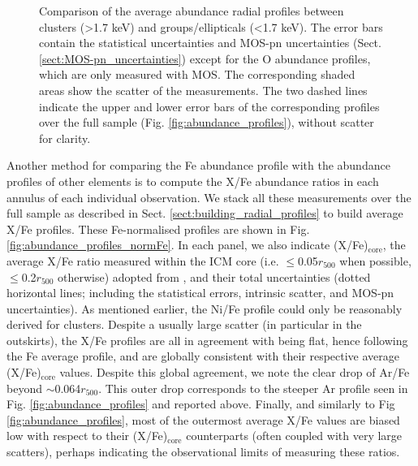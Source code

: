 \documentclass{aa}
\begin{document}
\begin{figure}[!]
        \caption{Comparison of the average abundance radial profiles between clusters (>1.7 keV) and groups/ellipticals (<1.7 keV). The error bars contain the statistical uncertainties and MOS-pn uncertainties (Sect. \ref{sect:MOS-pn_uncertainties}) except for the O abundance profiles, which are only measured with MOS. The corresponding shaded areas show the scatter of the measurements. The two dashed lines indicate the upper and lower error bars of the corresponding profiles over the full sample (Fig. \ref{fig:abundance_profiles}), without scatter for clarity.}
\label{fig:abundance_profiles_clgr}
\end{figure}



Another method for comparing the Fe abundance profile with the abundance profiles of other elements is to compute the X/Fe abundance ratios in each annulus of each individual observation. We stack all these measurements over the full sample as described in Sect. \ref{sect:building_radial_profiles} to build average X/Fe profiles. These Fe-normalised profiles are shown in Fig. \ref{fig:abundance_profiles_normFe}. In each panel, we also indicate (X/Fe)$_\text{core}$, the average X/Fe ratio measured within the ICM core (i.e. $\le$0.05$r_{500}$ when possible, $\le$0.2$r_{500}$ otherwise) adopted from \citet{2016A&A...592A.157M}, and their total uncertainties (dotted horizontal lines; including the statistical errors, intrinsic scatter, and MOS-pn uncertainties). As mentioned earlier, the Ni/Fe profile could only be reasonably derived for clusters. Despite a usually large scatter (in particular in the outskirts), the X/Fe profiles are all in agreement with being flat, hence following the Fe average profile, and are globally consistent with their respective average (X/Fe)$_\text{core}$ values. Despite this global agreement, we note the clear drop of Ar/Fe beyond $\sim$0.064$r_{500}$. This outer drop corresponds to the steeper Ar profile seen in Fig. \ref{fig:abundance_profiles} and reported above. Finally, and similarly to Fig \ref{fig:abundance_profiles}, most of the outermost average X/Fe values are biased low with respect to their (X/Fe)$_\text{core}$ counterparts (often coupled with very large scatters), perhaps indicating the observational limits of measuring these ratios.
\end{document}
